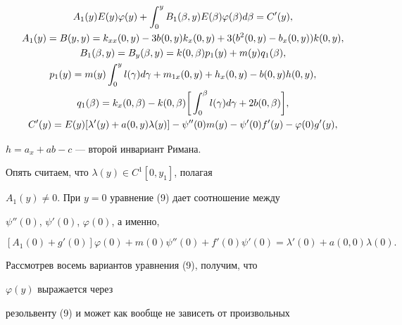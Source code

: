 \begin{gather}


A_{1}(y)E(y)\varphi(y)+\int_{0}^{y} B_{1}(\beta,y)E(\beta)


\varphi(\beta)d\beta = C'(y), \\


%


A_{1}(y) = B(y,y)=k_{xx}(0,y)-3b(0,y)k_{x}(0,y)+3(b^{2}(0,y)-


b_{x}(0,y)) k(0,y),\notag \\


%


B_{1}(\beta,y) = B_{y}(\beta,y)=k(0,\beta)p_{1}(y)+m(y)q_{1}


(\beta),\notag \\


%


p_{1}(y)=m(y)\int_{0}^{y} l(\gamma) d\gamma+m_{1x}(0,y)+h_{x}(0,y)-


b(0,y)h(0,y),\notag \\


%


q_{1}(\beta)=k_{x}(0,\beta)-k(0,\beta)\bigg [ \int_{0}^{\beta}


l(\gamma) d\gamma+2b(0,\beta)\bigg ],\notag \\


%


C'(y)=E(y)[\lambda'(y)+a(0,y)\lambda(y)]-\psi''(0)m(y)-


\psi'(0)f'(y)-\varphi(0)g'(y),\notag


\end{gather}


$h=a_{x}+ab-c$ --- второй инвариант Римана.


Опять считаем, что $\lambda(y)\in C^{1}[0,y_{1}]$, полагая


$A_{1}(y)\ne0$. При $y=0$ уравнение (9) дает соотношение между


$\psi''(0)$, $\psi'(0)$, $\varphi(0)$, а именно,


$$


[A_{1}(0)+g'(0)]\varphi(0)+m(0)\psi''(0)+f'(0)\psi'(0)=


\lambda'(0)+a(0,0)\lambda(0).


$$





Рассмотрев восемь вариантов уравнения (9), получим, что


$\varphi(y)$ выражается через


резольвенту (9) и может как вообще не зависеть от произвольных



